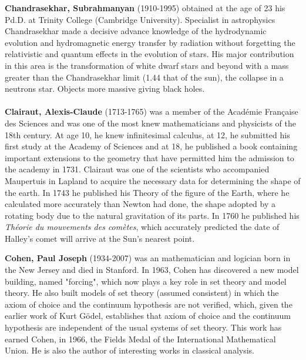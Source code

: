 \textbf{Chandrasekhar, Subrahmanyan} (1910-1995) obtained at the age of 23 his Pd.D. at Trinity College (Cambridge University). Specialist in astrophysics Chandrasekhar made a decisive advance knowledge of the hydrodynamic evolution and hydromagnetic energy transfer by radiation without forgetting the relativistic and quantum effects in the evolution of stars. His major contribution in this area is the transformation of white dwarf stars and beyond with a mass greater than the Chandrasekhar limit (1.44 that of the sun), the collapse in a neutrons star. Objects more massive giving black holes.\\\\

\textbf{Clairaut, Alexis-Claude} (1713-1765) was a member of the Académie Française des Sciences and was one of the most knew mathematicians and physicists of the 18th century. At age 10, he knew infinitesimal calculus, at 12, he submitted his first study at the Academy of Sciences and at 18, he published a book containing important extensions to the geometry that have permitted him the admission to the academy in 1731. Clairaut was one of the scientists who accompanied Maupertuis in Lapland to acquire the necessary data for determining the shape of the earth. In 1743 he published his Theory of the figure of the Earth, where he calculated more accurately than Newton had done, the shape adopted by a rotating body due to the natural gravitation of its parts. In 1760 he published his \textit{Théorie du mouvements des comètes}, which accurately predicted the date of Halley's comet will arrive at the Sun's nearest point.

\textbf{Cohen, Paul Joseph} (1934-2007) was an mathematician and logician born in the New Jersey and died in Stanford. In 1963, Cohen has discovered a new model building, named "forcing", which now plays a key role in set theory and model theory. He also built models of set theory (assumed consistent) in which the axiom of choice and the continuum hypothesis are not verified, which, given the earlier work of Kurt Gödel, establishes that axiom of choice and the continuum hypothesis are independent of the usual systems of set theory. This work has earned Cohen, in 1966, the Fields Medal of the International Mathematical Union. He is also the author of interesting works in classical analysis.

